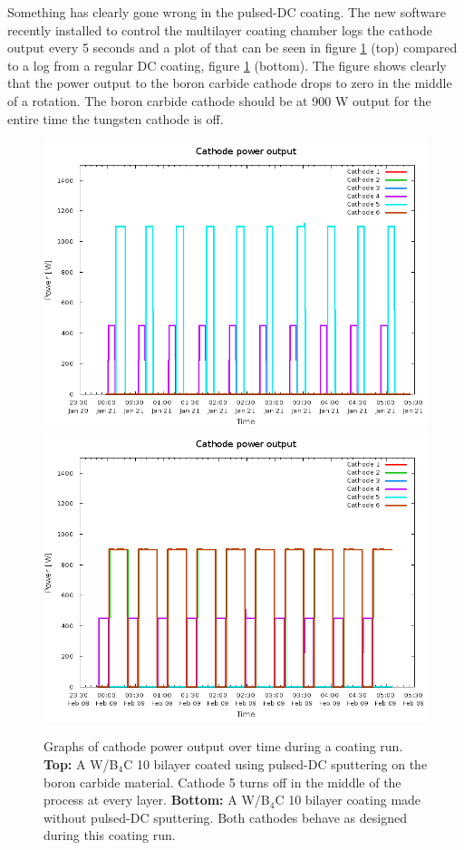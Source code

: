 Something has clearly gone wrong in the pulsed-DC coating. The new software recently installed to control the multilayer coating chamber logs the cathode output every 5 seconds and a plot of that can be seen in figure \ref{fig:power-output} (top) compared to a log from a regular DC coating, figure \ref{fig:power-output} (bottom). The figure shows clearly that the power output to the boron carbide cathode drops to zero in the middle of a rotation. The boron carbide cathode should be at 900 W output for the entire time the tungsten cathode is off.

\begin{figure}[!hbtp]
	\center
	\includegraphics[width=0.8\linewidth]{figures/athena/coatings/power_output_rf_coating.png}
	\includegraphics[width=0.8\linewidth]{figures/athena/coatings/power_output_dc_coating.png}
\caption{\footnotesize Graphs of cathode power output over time during a coating run. \textbf{Top:} A W/B$_4$C 10 bilayer coated using pulsed-DC sputtering on the boron carbide material. Cathode 5 turns off in the middle of the process at every layer. \textbf{Bottom:} A W/B$_4$C 10 bilayer coating made without pulsed-DC sputtering. Both cathodes behave as designed during this coating run.}\label{fig:power-output}
\end{figure}

